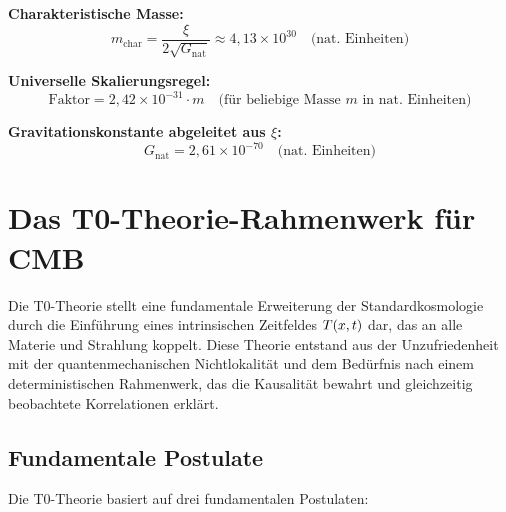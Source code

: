 \documentclass[12pt,a4paper]{article}
\begin{document}
	\textbf{Charakteristische Masse:}
	\begin{equation}
		m_{\text{char}} = \frac{\xi}{2\sqrt{G_{\text{nat}}}} \approx 4,13 \times 10^{30} \quad \text{(nat. Einheiten)}
	\end{equation}
	
	\textbf{Universelle Skalierungsregel:}
	\begin{equation}
		\text{Faktor} = 2,42 \times 10^{-31} \cdot m \quad \text{(für beliebige Masse } m \text{ in nat. Einheiten)}
	\end{equation}
	
	\textbf{Gravitationskonstante abgeleitet aus $\xi$:}
	\begin{equation}
		G_{\text{nat}} = 2,61 \times 10^{-70} \quad \text{(nat. Einheiten)}
	\end{equation}
	
	
	\section{Das T0-Theorie-Rahmenwerk für CMB}
	\label{sec:t0_framework}
	
	Die T0-Theorie stellt eine fundamentale Erweiterung der Standardkosmologie durch die Einführung eines intrinsischen Zeitfeldes $T(x,t)$ dar, das an alle Materie und Strahlung koppelt. Diese Theorie entstand aus der Unzufriedenheit mit der quantenmechanischen Nichtlokalität und dem Bedürfnis nach einem deterministischen Rahmenwerk, das die Kausalität bewahrt und gleichzeitig beobachtete Korrelationen erklärt.
	
	\subsection{Fundamentale Postulate}
	
	Die T0-Theorie basiert auf drei fundamentalen Postulaten:
	
\end{document}
